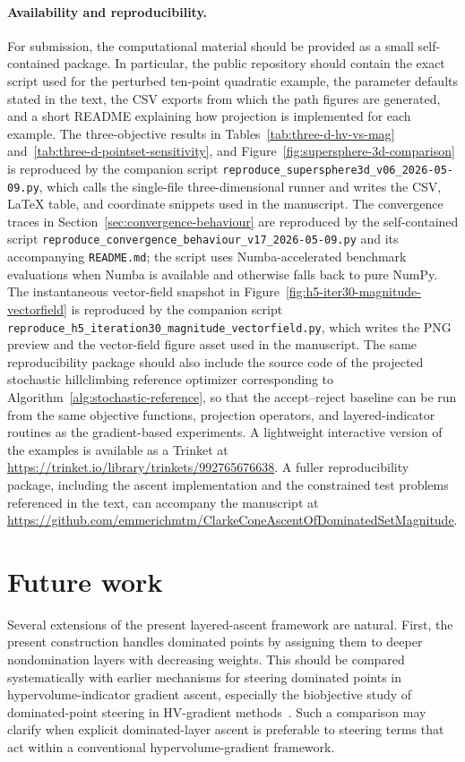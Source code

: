 \documentclass{article}
\begin{document}
\paragraph{Availability and reproducibility.}
For submission, the computational material should be provided as a small self-contained package. In particular, the public repository should contain the exact script used for the perturbed ten-point quadratic example, the parameter defaults stated in the text, the CSV exports from which the path figures are generated, and a short README explaining how projection is implemented for each example.  The three-objective results in Tables~\ref{tab:three-d-hv-vs-mag} and~\ref{tab:three-d-pointset-sensitivity}, and Figure~\ref{fig:supersphere-3d-comparison} is reproduced by the companion script \texttt{reproduce\_supersphere3d\_v06\_2026-05-09.py}, which calls the single-file three-dimensional runner and writes the CSV, LaTeX table, and coordinate snippets used in the manuscript.  The convergence traces in Section~\ref{sec:convergence-behaviour} are reproduced by the self-contained script \texttt{reproduce\_convergence\_behaviour\_v17\_2026-05-09.py} and its accompanying \texttt{README.md}; the script uses Numba-accelerated benchmark evaluations when Numba is available and otherwise falls back to pure NumPy.  The instantaneous vector-field snapshot in Figure~\ref{fig:h5-iter30-magnitude-vectorfield} is reproduced by the companion script \texttt{reproduce\_h5\_iteration30\_magnitude\_vectorfield.py}, which writes the PNG preview and the vector-field figure asset used in the manuscript.  The same reproducibility package should also include the source code of the projected stochastic hillclimbing reference optimizer corresponding to Algorithm~\ref{alg:stochastic-reference}, so that the accept--reject baseline can be run from the same objective functions, projection operators, and layered-indicator routines as the gradient-based experiments. A lightweight interactive version of the examples is available as a Trinket at \url{https://trinket.io/library/trinkets/992765676638}. A fuller reproducibility package, including the ascent implementation and the constrained test problems referenced in the text, can accompany the manuscript at \url{https://github.com/emmerichmtm/ClarkeConeAscentOfDominatedSetMagnitude}.

\section{Future work}
Several extensions of the present layered-ascent framework are natural.  First, the present construction handles dominated points by assigning them to deeper nondomination layers with decreasing weights.  This should be compared systematically with earlier mechanisms for steering dominated points in hypervolume-indicator gradient ascent, especially the biobjective study of dominated-point steering in HV-gradient methods~\cite{wangrendeutzemmerich2016}.  Such a comparison may clarify when explicit dominated-layer ascent is preferable to steering terms that act within a conventional hypervolume-gradient framework.
\end{document}
